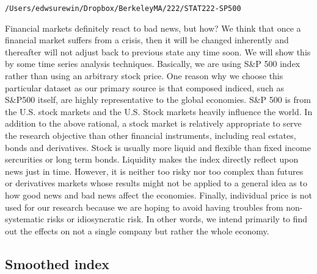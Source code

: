 \documentclass[letterpaper,10pt,english]{/Users/edwsurewin/anaconda/lib/python2.7/site-packages/sphinx/texinputs/sphinxhowto}
\newenvironment{InvisibleVerbatim}
        {\begin{mdframed}[leftmargin=0.1\linewidth,innerleftmargin=3pt,innerrightmargin=3pt, userdefinedwidth=1\linewidth, linewidth=0pt, linecolor=white, usetwoside=false]}
        {\end{mdframed}}
\begin{document}
        

            
                \begin{InvisibleVerbatim}
                \vspace{-0.5\baselineskip}
\begin{alltt}/Users/edwsurewin/Dropbox/Berkeley MA/222/STAT222-SP500
\end{alltt}

            \end{InvisibleVerbatim}
            
        
    
Financial markets definitely react to bad news, but how? We think that
once a financial market suffers from a crisis, then it will be changed
inherently and thereafter will not adjust back to previous state any
time soon. We will show this by some time series analysis techniques.
Basically, we are using S\&P 500 index rather than using an arbitrary
stock price. One reason why we choose this particular dataset as our
primary source is that composed indiced, such as S\&P500 itself, are
highly representative to the global economies. S\&P 500 is from the U.S.
stock markets and the U.S. Stock markets heavily influence the world. In
addition to the above rational, a stock market is relatively appropriate
to serve the research objective than other financial instruments,
including real estates, bonds and derivatives. Stock is usually more
liquid and flexible than fixed income sercurities or long term bonds.
Liquidity makes the index directly reflect upon news just in time.
However, it is neither too risky nor too complex than futures or
derivatives markets whose results might not be applied to a general idea
as to how good news and bad news affect the economies. Finally,
individual price is not used for our research because we are hoping to
avoid having troubles from non-systematic risks or idiosyncratic risk.
In other words, we intend primarily to find out the effects on not a
single company but rather the whole economy.\subsection{Smoothed index}\label{smoothed-index}

\end{document}
